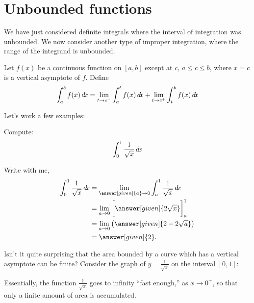 \documentclass{ximera}
\begin{document}
\section{Unbounded functions}

We have just considered definite integrals where the interval of
integration was unbounded. We now consider another type of improper
integration, where the range of the integrand is unbounded.

\begin{definition}
Let $f(x)$ be a continuous function on $[a,b]$ except at $c$, $a\leq
c\leq b$, where $x=c$ is a vertical asymptote of $f$. Define
\[
\int_a^b f(x)\mathop{}\!d\! x = \lim_{t\to c^-}\int_a^t f(x)\mathop{}\!d\! x + \lim_{t\to c^+}\int_t^b f(x)\mathop{}\!d\! x
\]
\end{definition}

Let's work a few examples:

\begin{example}	
  Compute:
  \[
  \int_{0}^1 \frac{1}{\sqrt{x}} \mathop{}\!d\! x
  \]
  \begin{explanation}
    Write with me,
    \begin{align*}
      \int_{0}^1 \frac{1}{\sqrt{x}} \d x &= \lim_{\answer[given]{a} \to 0} \int_{a}^1 \frac{1}{\sqrt{x}} \d x \\
      &=  \lim_{a \to 0}  \eval{\answer[given]{2\sqrt{x}}}_a^1 \\
      &=  \lim_{a \to 0} \left(\answer[given]{2-2\sqrt{a}}\right)\\
      &= \answer[given]{2}.
    \end{align*}
  \end{explanation}
\end{example}

Isn't it quite surprising that the area bounded by a curve which has a
vertical asymptote can be finite? Consider the graph of $y=
\frac{1}{\sqrt{x}}$ on the interval $[0,1]$:
\begin{image}
\end{image}
Essentially, the function $\frac{1}{\sqrt{x}}$ goes to infinity ``fast
enough,'' as $x\to 0^+$, so that only a finite amount of area is
accumulated.
\end{document}
